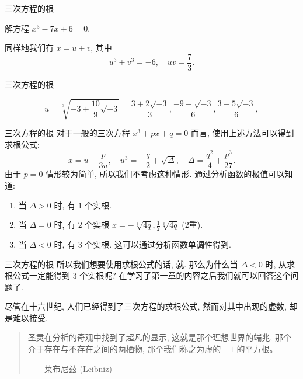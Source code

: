 \begin{frame}{三次方程的根}
\onslide<+->
\begin{example}
解方程 $x^3-7x+6=0$.
\end{example}
\onslide<+->
\begin{solution}
\indent 同样地我们有 $x=u+v$, 其中
	\[u^3+v^3=-6,\quad uv=\frac73.\]

\end{solution}
\end{frame}


\begin{frame}{三次方程的根}
\onslide<+->
\begin{solutionc}
	\[u=\sqrt[3]{-3+\frac{10}9\sqrt{-3}}
	=\frac{3+2\sqrt{-3}}3,\frac{-9+\sqrt{-3}}6,\frac{3-5\sqrt{-3}}6,\]
\visible<+->{相应地
	\[v=\frac{3-2\sqrt{-3}}3,\frac{-9-\sqrt{-3}}6,\frac{3+5\sqrt{-3}}6,\]}
\visible<+->{\[x=u+v=2,-3,1.\]}
\end{solutionc}
\end{frame}


\begin{frame}{三次方程的根}
\onslide<+->对于一般的三次方程 $x^3+px+q=0$ 而言, 使用上述方法可以得到求根公式:
\[x=u-\frac p{3u},\quad u^3=-\frac q2+\sqrt{\Delta},\quad \Delta=\frac{q^2}4+\frac{p^3}{27}.\]
\onslide<+->由于 $p=0$ 情形较为简单, 所以我们不考虑这种情形.
\onslide<+->通过分析函数的极值可以知道:
\begin{enumerate}
\item 当 $\Delta>0$ 时, 有 $1$ 个实根.
\item 当 $\Delta=0$ 时, 有 $2$ 个实根 $x=-\sqrt[3]{4q},\frac12\sqrt[3]{4q}$ ($2$重).
\item 当 $\Delta<0$ 时, 有 $3$ 个实根. 这可以通过分析函数单调性得到.
\end{enumerate}
\end{frame}


\begin{frame}{三次方程的根}
\onslide<+->所以我们想要使用求根公式的话, 就.
\onslide<+->那么为什么当 $\Delta<0$ 时, 从求根公式一定能得到 $3$ 个实根呢?
\onslide<+->在学习了第一章的内容之后我们就可以回答这个问题了.

\onslide<+->尽管在十六世纪, 人们已经得到了三次方程的求根公式, 然而对其中出现的虚数, 却是难以接受.
\vspace{\baselineskip}
\begin{quote}
圣灵在分析的奇观中找到了超凡的显示, 这就是那个理想世界的端兆, 那个介于存在与不存在之间的两栖物, 那个我们称之为虚的 $-1$ 的平方根。
\begin{flushright}
——莱布尼兹 (Leibniz)
\end{flushright}
\end{quote}
\end{frame}


